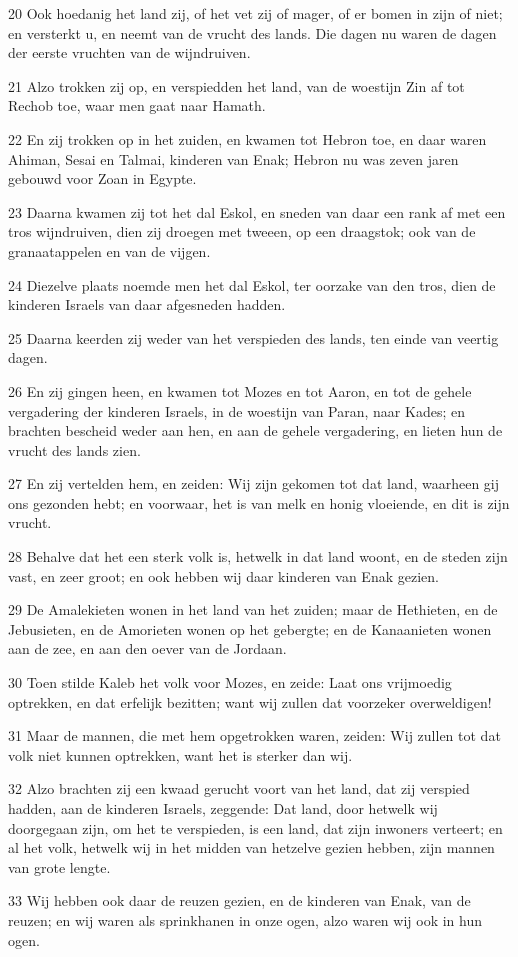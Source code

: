 \par 20 Ook hoedanig het land zij, of het vet zij of mager, of er bomen in zijn of niet; en versterkt u, en neemt van de vrucht des lands. Die dagen nu waren de dagen der eerste vruchten van de wijndruiven.
\par 21 Alzo trokken zij op, en verspiedden het land, van de woestijn Zin af tot Rechob toe, waar men gaat naar Hamath.
\par 22 En zij trokken op in het zuiden, en kwamen tot Hebron toe, en daar waren Ahiman, Sesai en Talmai, kinderen van Enak; Hebron nu was zeven jaren gebouwd voor Zoan in Egypte.
\par 23 Daarna kwamen zij tot het dal Eskol, en sneden van daar een rank af met een tros wijndruiven, dien zij droegen met tweeen, op een draagstok; ook van de granaatappelen en van de vijgen.
\par 24 Diezelve plaats noemde men het dal Eskol, ter oorzake van den tros, dien de kinderen Israels van daar afgesneden hadden.
\par 25 Daarna keerden zij weder van het verspieden des lands, ten einde van veertig dagen.
\par 26 En zij gingen heen, en kwamen tot Mozes en tot Aaron, en tot de gehele vergadering der kinderen Israels, in de woestijn van Paran, naar Kades; en brachten bescheid weder aan hen, en aan de gehele vergadering, en lieten hun de vrucht des lands zien.
\par 27 En zij vertelden hem, en zeiden: Wij zijn gekomen tot dat land, waarheen gij ons gezonden hebt; en voorwaar, het is van melk en honig vloeiende, en dit is zijn vrucht.
\par 28 Behalve dat het een sterk volk is, hetwelk in dat land woont, en de steden zijn vast, en zeer groot; en ook hebben wij daar kinderen van Enak gezien.
\par 29 De Amalekieten wonen in het land van het zuiden; maar de Hethieten, en de Jebusieten, en de Amorieten wonen op het gebergte; en de Kanaanieten wonen aan de zee, en aan den oever van de Jordaan.
\par 30 Toen stilde Kaleb het volk voor Mozes, en zeide: Laat ons vrijmoedig optrekken, en dat erfelijk bezitten; want wij zullen dat voorzeker overweldigen!
\par 31 Maar de mannen, die met hem opgetrokken waren, zeiden: Wij zullen tot dat volk niet kunnen optrekken, want het is sterker dan wij.
\par 32 Alzo brachten zij een kwaad gerucht voort van het land, dat zij verspied hadden, aan de kinderen Israels, zeggende: Dat land, door hetwelk wij doorgegaan zijn, om het te verspieden, is een land, dat zijn inwoners verteert; en al het volk, hetwelk wij in het midden van hetzelve gezien hebben, zijn mannen van grote lengte.
\par 33 Wij hebben ook daar de reuzen gezien, en de kinderen van Enak, van de reuzen; en wij waren als sprinkhanen in onze ogen, alzo waren wij ook in hun ogen.

